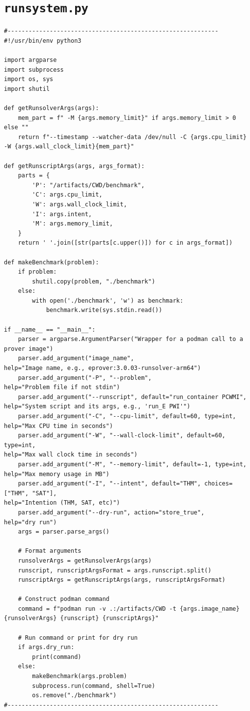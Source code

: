 \documentclass{easychair}
\begin{document}
\section{{\tt runsystem.py}}
\label{runsystem}
{\footnotesize
\begin{verbatim}
#------------------------------------------------------------
#!/usr/bin/env python3

import argparse
import subprocess
import os, sys
import shutil

def getRunsolverArgs(args):
    mem_part = f" -M {args.memory_limit}" if args.memory_limit > 0 else ""
    return f"--timestamp --watcher-data /dev/null -C {args.cpu_limit} -W {args.wall_clock_limit}{mem_part}"

def getRunscriptArgs(args, args_format):
    parts = {
        'P': "/artifacts/CWD/benchmark",
        'C': args.cpu_limit,
        'W': args.wall_clock_limit,
        'I': args.intent,
        'M': args.memory_limit,
    }
    return ' '.join([str(parts[c.upper()]) for c in args_format])

def makeBenchmark(problem):
    if problem:
        shutil.copy(problem, "./benchmark")
    else:
        with open('./benchmark', 'w') as benchmark:
            benchmark.write(sys.stdin.read())

if __name__ == "__main__":
    parser = argparse.ArgumentParser("Wrapper for a podman call to a prover image")
    parser.add_argument("image_name", 
help="Image name, e.g., eprover:3.0.03-runsolver-arm64")
    parser.add_argument("-P", "--problem", 
help="Problem file if not stdin")
    parser.add_argument("--runscript", default="run_container PCWMI", 
help="System script and its args, e.g., 'run_E PWI'")
    parser.add_argument("-C", "--cpu-limit", default=60, type=int, 
help="Max CPU time in seconds")
    parser.add_argument("-W", "--wall-clock-limit", default=60, type=int, 
help="Max wall clock time in seconds")
    parser.add_argument("-M", "--memory-limit", default=-1, type=int, 
help="Max memory usage in MB")
    parser.add_argument("-I", "--intent", default="THM", choices=["THM", "SAT"], 
help="Intention (THM, SAT, etc)")
    parser.add_argument("--dry-run", action="store_true", 
help="dry run")
    args = parser.parse_args()

    # Format arguments
    runsolverArgs = getRunsolverArgs(args)
    runscript, runscriptArgsFormat = args.runscript.split()
    runscriptArgs = getRunscriptArgs(args, runscriptArgsFormat)

    # Construct podman command
    command = f"podman run -v .:/artifacts/CWD -t {args.image_name} {runsolverArgs} {runscript} {runscriptArgs}"

    # Run command or print for dry run
    if args.dry_run:
        print(command)
    else:
        makeBenchmark(args.problem)
        subprocess.run(command, shell=True)
        os.remove("./benchmark")
#------------------------------------------------------------
\end{verbatim}
}
\end{document}
